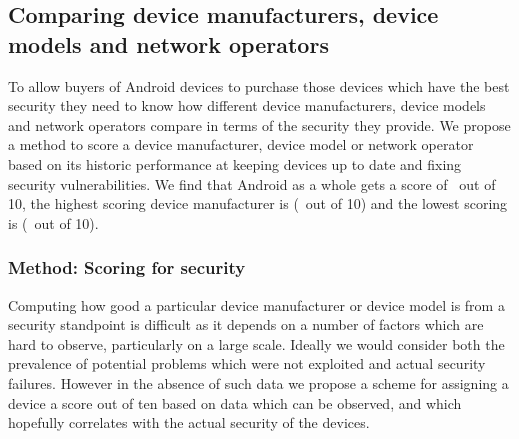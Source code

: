 \subsection{Comparing device manufacturers, device models and network operators}
\label{sec:security_scoring}\label{sec:exp:security_score}

To allow buyers of Android devices to purchase those devices which have the best security they need to know how different device manufacturers, device models and network operators compare in terms of the security they provide.
We propose a method to score a device manufacturer, device model or network operator based on its historic performance at keeping devices up to date and fixing security vulnerabilities.
We find that Android as a whole gets a score of \daSecurityScore\ out of 10, the highest scoring device manufacturer is \emph{\daSecScoreBestmanufacturer} (\daSecScoreBestmanufacturerScore\ out of 10) and the lowest scoring is \emph{\daSecScoreWorstmanufacturer} (\daSecScoreWorstmanufacturerScore\ out of 10).

\subsubsection{Method: Scoring for security}

Computing how good a particular device manufacturer or device model is from a security standpoint is difficult as it depends on a number of factors which are hard to observe, particularly on a large scale.
Ideally we would consider both the prevalence of potential problems which were not exploited and actual security failures.
However in the absence of such data we propose a scheme for assigning a device a score out of ten based on data which can be observed, and which hopefully correlates with the actual security of the devices.

